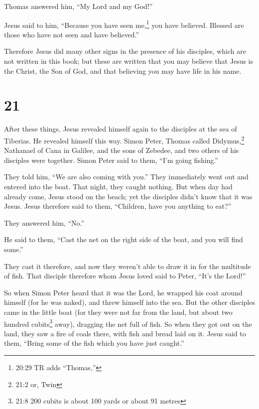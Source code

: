  Thomas answered him, ``My Lord and my God!''

 Jesus said to him, ``Because you have seen me,\footnote{20:29
  TR adds ``Thomas,''} you have believed. Blessed are those who have not
seen and have believed.''

 Therefore Jesus did many other signs in the presence of
his disciples, which are not written in this book;  but
these are written that you may believe that Jesus is the Christ, the Son
of God, and that believing you may have life in his name.

\hypertarget{section-20}{%
\section{21}\label{section-20}}

 After these things, Jesus revealed himself again to the
disciples at the sea of Tiberias. He revealed himself this way.
 Simon Peter, Thomas called Didymus,\footnote{21:2 or, Twin}
Nathanael of Cana in Galilee, and the sons of Zebedee, and two others of
his disciples were together.  Simon Peter said to them,
``I'm going fishing.''

They told him, ``We are also coming with you.'' They immediately went
out and entered into the boat. That night, they caught nothing.
 But when day had already come, Jesus stood on the beach;
yet the disciples didn't know that it was Jesus.  Jesus
therefore said to them, ``Children, have you anything to eat?''

They answered him, ``No.''

 He said to them, ``Cast the net on the right side of the
boat, and you will find some.''

They cast it therefore, and now they weren't able to draw it in for the
multitude of fish.  That disciple therefore whom Jesus loved
said to Peter, ``It's the Lord!''

So when Simon Peter heard that it was the Lord, he wrapped his coat
around himself (for he was naked), and threw himself into the sea.
 But the other disciples came in the little boat (for they
were not far from the land, but about two hundred cubits\footnote{21:8
  200 cubits is about 100 yards or about 91 metres} away), dragging the
net full of fish.  So when they got out on the land, they
saw a fire of coals there, with fish and bread laid on it. 
Jesus said to them, ``Bring some of the fish which you have just
caught.''

